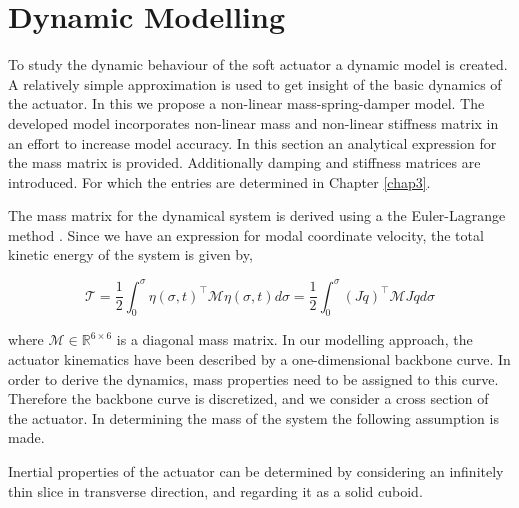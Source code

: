 




\section{Dynamic Modelling}


To study the dynamic behaviour of the soft actuator a dynamic model is created. A relatively simple approximation is used to get insight of the basic dynamics of the actuator. In this we propose a non-linear mass-spring-damper model. The developed model incorporates non-linear mass and non-linear stiffness matrix in an effort to increase model accuracy. In this section an analytical expression for the mass matrix is provided. Additionally damping and stiffness matrices are introduced. For which the entries are determined in Chapter \ref{chap3}.

The mass matrix for the dynamical system is derived using a the Euler-Lagrange method \cite{Caasenbrood2020}. Since we have an expression for modal coordinate velocity, the total kinetic energy of the system is given by,


\begin{equation}
    \mathcal{T} = \frac{1}{2}\int_0^{\sigma} \eta(\sigma,t)^\top \mathcal{M} \eta(\sigma,t) d \sigma  = \frac{1}{2}\int_0^{\sigma} (J \dot{q})^\top \mathcal{M} J\dot{q} d \sigma
    \label{eq2:T}
\end{equation}

where $\mathcal{M} \in \mathbb{R}^{6\times6}$ is a diagonal mass matrix. In our modelling approach, the actuator kinematics have been described by a one-dimensional backbone curve. In order to derive the dynamics, mass properties need to be assigned to this curve. Therefore the backbone curve is discretized, and we consider a cross section of the actuator. In determining the mass of the system the following assumption is made. 

\begin{theorem}
Inertial properties of the actuator can be determined by considering an infinitely thin slice in transverse direction, and regarding it as a solid cuboid.
\end{theorem}


